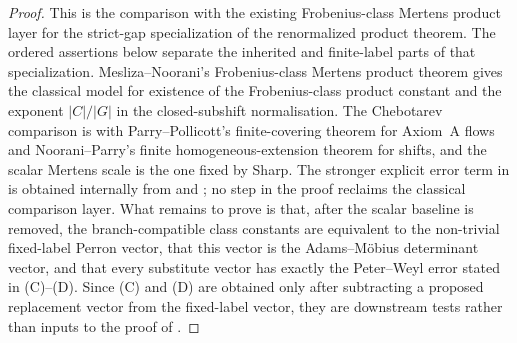 \begin{proof}
  This is the comparison with the existing Frobenius-class Mertens product
  layer for the strict-gap specialization of the renormalized product theorem.
  The ordered assertions below separate the inherited and finite-label parts
  of that specialization.  Mesliza--Noorani's Frobenius-class Mertens product
  theorem gives the classical model for existence of the Frobenius-class
  product constant and the exponent \(|C|/|G|\) in the closed-subshift
  normalisation.  The Chebotarev comparison is with Parry--Pollicott's
  finite-covering theorem for Axiom~A flows and Noorani--Parry's finite
  homogeneous-extension theorem for shifts, and the scalar Mertens scale is the
  one fixed by Sharp.  The stronger explicit
  error term in  is obtained internally
  from  and
  ; no step in the proof reclaims
  the classical comparison layer.  What remains to prove is
  that, after the scalar baseline is removed, the branch-compatible class
  constants are equivalent to the non-trivial fixed-label Perron vector, that
  this vector is the Adams--M\"obius determinant vector, and that every
  substitute vector has exactly the Peter--Weyl error stated in
  \textup{(C)}--\textup{(D)}.  Since \textup{(C)} and \textup{(D)} are obtained
  only after subtracting a proposed replacement vector from the fixed-label
  vector, they are downstream tests rather than inputs to the proof of
  .


\end{proof}
